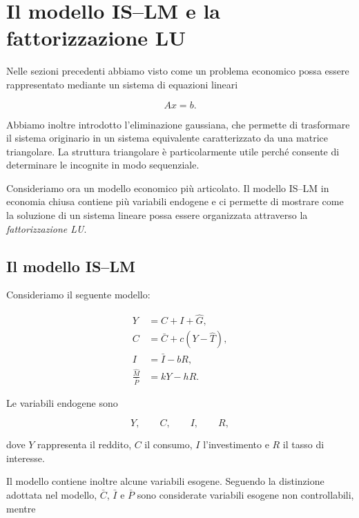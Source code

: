 \section{\textbf{Il modello IS--LM e la fattorizzazione LU}}
\label{sec:islm-lu}

Nelle sezioni precedenti abbiamo visto come un problema economico
possa essere rappresentato mediante un sistema di equazioni lineari

\begin{equation*}
    Ax=b.
\end{equation*}

Abbiamo inoltre introdotto l'eliminazione gaussiana, che permette
di trasformare il sistema originario in un sistema equivalente
caratterizzato da una matrice triangolare. La struttura triangolare
è particolarmente utile perché consente di determinare le incognite
in modo sequenziale.

Consideriamo ora un modello economico più articolato. Il modello
IS--LM in economia chiusa contiene più variabili endogene e ci
permette di mostrare come la soluzione di un sistema lineare possa
essere organizzata attraverso la \emph{fattorizzazione LU}.


\subsection{Il modello IS--LM}

Consideriamo il seguente modello:

\begin{align}
    Y &= C + I + \hat{G},
    \label{eq:islm-reddito}\\
    C &= \bar{C} + c(Y-\hat{T}),
    \label{eq:islm-consumo}\\
    I &= \bar{I} - bR,
    \label{eq:islm-investimento}\\
    \frac{\hat{M}}{\bar{P}} &= kY-hR.
    \label{eq:islm-moneta}
\end{align}

Le variabili endogene sono

\begin{equation*}
    Y,\qquad C,\qquad I,\qquad R,
\end{equation*}

dove $Y$ rappresenta il reddito, $C$ il consumo, $I$
l'investimento e $R$ il tasso di interesse.

Il modello contiene inoltre alcune variabili esogene. Seguendo la
distinzione adottata nel modello, $\bar C$, $\bar I$ e $\bar P$
sono considerate variabili esogene non controllabili, mentre

